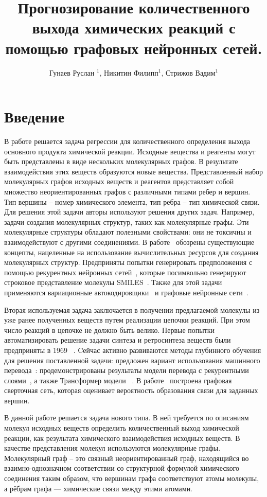 \documentclass[12pt, twoside]{article}
\title
[Прогнозирование количественного выхода химических реакций.]
{Прогнозирование количественного выхода химических реакций с помощью графовых нейронных сетей.}
\author{Гунаев Руслан $^1$, Никитин Филипп$^1$, Стрижов Вадим$^1$}
\begin{document}
\maketitle
\section{Введение}
В работе решается задача регрессии для количественного определения выхода основного продукта химической реакции. Исходные вещества и реагенты могут быть представлены в виде нескольких молекулярных графов. В результате взаимодействия этих веществ образуются новые вещества. Представленный набор молекулярных графов исходных веществ и реагентов представляет собой множество неориентированных графов с различными типами ребер и вершин. Тип вершины -- номер химического элемента, тип ребра -- тип химической связи. 
Для решения этой задачи авторы используют решения других задач. Например, задачи создания молекулярных структур, таких как молекулярные графы. Эти молекулярные структуры обладают полезными свойствами: они не токсичны и взаимодействуют с другими соединениями.
В работе~\cite{schneider2005computer} обозрены существующие концепты, нацеленные на использование вычислительных ресурсов для создания молекулярных структур. Предприняты попытки генерировать предположения с помощью рекурентных нейронных сетей~\cite{olivecrona2017molecular, gomez2018automatic}, которые посимвольно генерируют строковое представление молекулы SMILES~\cite{weininger1988smiles}. Также для этой задачи применяются вариационные автокодировщики~\cite{dai2018syntax} и графовые нейронные сети~\cite{de2018molgan, duvenaud2015convolutional}.   

Вторая используемая задача заключается в получении предлагаемой молекулы из уже ранее полученных веществ путем реализации цепочки реакций. При этом число реакций в цепочке не должно быть велико. Первые попытки автоматизировать решение задачи синтеза и ретросинтеза веществ были предприняты в 1969 ~\cite{corey1969computer}.
Cейчас активно развиваются методы глубинного обучения для решения поставленной задачи: предложен вариант использования машинного перевода~\cite{bahdanau2014neural}: продемонстрированы результаты модели перевода с рекурентными слоями~\cite{schwaller2018found}, а также Трансформер модели ~\cite{schwaller2018molecular}.  В работе~\cite{coley2018graph} построена графовая сверточная сеть, которая оценивает вероятность образования связи для заданных вершин.

В данной работе решается задача нового типа. В ней требуется по описаниям молекул исходных веществ определить количественный выход  химической реакции, как результата химического взаимодействия исходных веществ. В качестве представления молекул используются молекулярные графы. Молекулярный граф -- это связный неориентированный граф, находящийся во взаимно-однозначном соответствии со структурной формулой химического соединения таким образом, что вершинам графа соответствуют атомы молекулы, а рёбрам графа — химические связи между этими атомами. 
\end{document}
